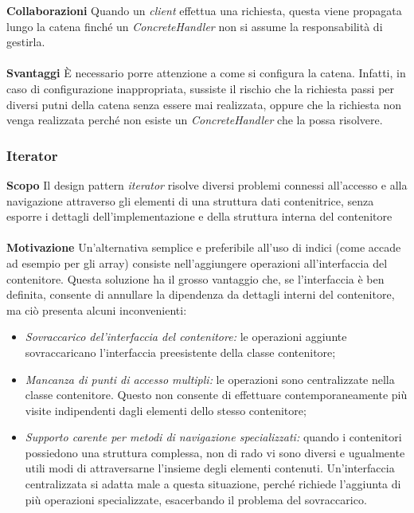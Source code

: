 \textbf{Collaborazioni}		Quando un \textit{client} effettua una richiesta, questa viene propagata lungo la catena finché un \textit{ConcreteHandler} non si assume la responsabilità di gestirla.
\\\\
\textbf{Svantaggi}	È necessario porre attenzione a come si configura la catena. Infatti, in caso di configurazione inappropriata, sussiste il rischio che la richiesta passi per diversi putni della catena senza essere mai realizzata, oppure che la richiesta non venga realizzata perché non esiste un \textit{ConcreteHandler} che la possa risolvere.


\subsubsection{Iterator}
\textbf{Scopo}	Il design pattern \textit{iterator} risolve diversi problemi connessi all'accesso e alla navigazione attraverso gli elementi di una struttura dati contenitrice, senza esporre i dettagli dell'implementazione e della struttura interna del contenitore
\\\\
\textbf{Motivazione}	Un'alternativa semplice e preferibile all'uso di indici (come accade ad esempio per gli array) consiste nell'aggiungere operazioni all'interfaccia del contenitore. Questa soluzione ha il grosso vantaggio che, se l'interfaccia è ben definita, consente di annullare la dipendenza da dettagli interni del contenitore, ma ciò presenta alcuni inconvenienti:
	\begin{itemize}
		\item \textit{Sovraccarico del'interfaccia del contenitore:} le operazioni aggiunte sovraccaricano l'interfaccia preesistente della classe contenitore;
		\item \textit{Mancanza di punti di accesso multipli:} le operazioni sono centralizzate nella classe contenitore. Questo non consente di effettuare contemporaneamente più visite indipendenti dagli elementi dello stesso contenitore;
		\item \textit{Supporto carente per metodi di navigazione specializzati:} quando i contenitori possiedono una struttura complessa, non di rado vi sono diversi e ugualmente utili modi di attraversarne l'insieme degli elementi contenuti. Un'interfaccia centralizzata si adatta male a questa situazione, perché richiede l'aggiunta di più operazioni specializzate, esacerbando il problema del sovraccarico.
	\end{itemize}
